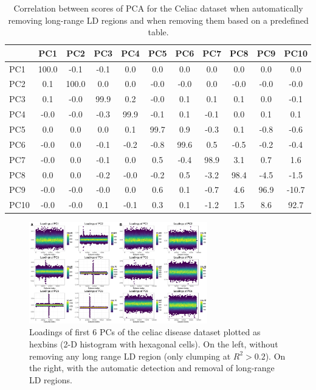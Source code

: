 \documentclass{bioinfo}
\begin{document}
\begin{table}[ht]
\centering
\begin{tabular}{l|cccccccccc}
  \hline
 & PC1 & PC2 & PC3 & PC4 & PC5 & PC6 & PC7 & PC8 & PC9 & PC10 \\
  \hline
PC1 & 100.0 & -0.1 & -0.1 & 0.0 & 0.0 & 0.0 & 0.0 & 0.0 & 0.0 & 0.0 \\
  PC2 & 0.1 & 100.0 & 0.0 & 0.0 & -0.0 & -0.0 & 0.0 & -0.0 & -0.0 & -0.0 \\
  PC3 & 0.1 & -0.0 & 99.9 & 0.2 & -0.0 & 0.1 & 0.1 & 0.1 & 0.0 & -0.1 \\
  PC4 & -0.0 & -0.0 & -0.3 & 99.9 & -0.1 & 0.1 & -0.1 & 0.0 & 0.1 & 0.1 \\
  PC5 & 0.0 & 0.0 & 0.0 & 0.1 & 99.7 & 0.9 & -0.3 & 0.1 & -0.8 & -0.6 \\
  PC6 & -0.0 & 0.0 & -0.1 & -0.2 & -0.8 & 99.6 & 0.5 & -0.5 & -0.2 & -0.4 \\
  PC7 & -0.0 & 0.0 & -0.1 & 0.0 & 0.5 & -0.4 & 98.9 & 3.1 & 0.7 & 1.6 \\
  PC8 & 0.0 & 0.0 & -0.2 & -0.0 & -0.2 & 0.5 & -3.2 & 98.4 & -4.5 & -1.5 \\
  PC9 & -0.0 & -0.0 & -0.0 & 0.0 & 0.6 & 0.1 & -0.7 & 4.6 & 96.9 & -10.7 \\
  PC10 & -0.0 & -0.0 & 0.1 & -0.1 & 0.3 & 0.1 & -1.2 & 1.5 & 8.6 & 92.7 \\
   \hline
\end{tabular}
\caption{Correlation between scores of PCA for the Celiac dataset  when automatically removing long-range LD regions and when removing them based on a predefined table.}
\label{tab:pc-celiac}
\end{table}

\begin{figure}[!tpb]
\centerline{\includegraphics[width=220pt]{loadings}}
\caption{Loadings of first 6 PCs of the celiac disease dataset plotted as hexbins (2-D histogram with hexagonal cells). On the left, without removing any long range LD region (only clumping at $R^2 > 0.2$). On the right, with the automatic detection and removal of long-range LD regions.}\label{fig:loadings}
\end{figure}
\end{document}
